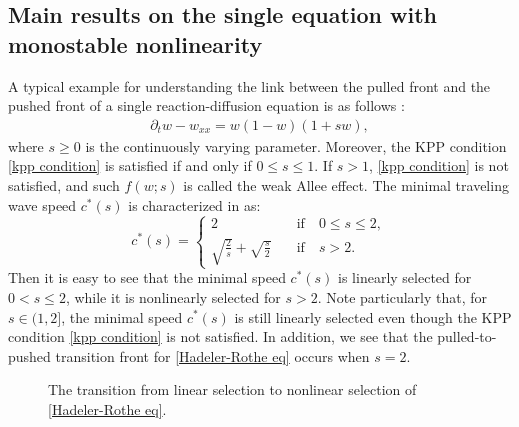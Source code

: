 \documentclass[11pt,a4paper]{article}
\numberwithin{equation}{section}
\numberwithin{figure}{section}
\newcommand\dps{\displaystyle}
\newcommand\bea{\begin{eqnarray}}
\newcommand\eea{\end{eqnarray}}
\begin{document}
\subsection{Main results on the single equation with monostable nonlinearity}
A typical example
for understanding the link between the pulled front and the pushed front of a single reaction-diffusion equation
is as follows %
\cite{Hadeler Rothe}:
\bea\label{Hadeler-Rothe eq}
\partial_t w-w_{xx}=w(1-w)(1+sw),
\eea
where $s\geq 0$ is the continuously varying parameter.  Moreover, the KPP condition \eqref{kpp condition} is satisfied if and only if $0\le s\le 1$.
If $s>1$, \eqref{kpp condition} is not satisfied, and such %
$f(w;s)$
is called the weak Allee effect.
The minimal traveling wave speed $c^*(s)$ is characterized in \cite{Hadeler Rothe} as:
\begin{equation*}
c^*(s)=
\begin{cases}
\dps 2&\quad\text{if}\quad 0\le s\le 2,\\
\dps \sqrt{\frac{2}{s}}+\sqrt{\frac{s}{2}}&\quad\text{if}\quad s>2.
\end{cases}
\end{equation*}
Then it is easy to see that the minimal speed  $c^*(s)$ is linearly selected for $0<s\le2$, while it is nonlinearly selected for $s>2$. Note particularly that, for $s\in(1,2]$, the minimal speed $c^*(s)$ is still linearly selected
even though the KPP condition \eqref{kpp condition} is not satisfied. 
In addition, we see that the pulled-to-pushed transition front for \eqref{Hadeler-Rothe eq} occurs when $s=2$.

\begin{figure}
\begin{center}
\caption{The transition from linear selection to nonlinear selection of \eqref{Hadeler-Rothe eq}.}
\end{center}
\end{figure}
\end{document}
